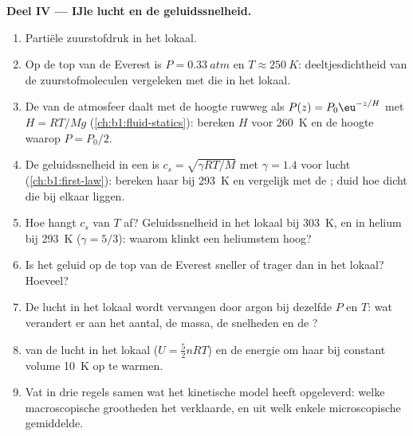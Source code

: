\begin{problem}
\medskip
\noindent\textbf{Deel IV --- IJle lucht en de geluidssnelheid.}
\begin{enumerate}[resume]
  \item Partiële zuurstofdruk in het lokaal.
  \item Op de top van de Everest is $P = \qty{0.33}{atm}$ en $T \approx \qty{250}{K}$:
        deeltjesdichtheid van de zuurstofmoleculen vergeleken met die in het lokaal.
  \item De  van de atmosfeer daalt met de hoogte ruwweg als
        $P(z) = P_0\eu^{-z/H}$ met $H = RT/Mg$ (\cref{ch:b1:fluid-statics}):
        bereken $H$ voor \qty{260}{K} en de hoogte waarop $P = P_0/2$.
  \item De geluidssnelheid in een  is $c_s = \sqrt{\gamma RT/M}$
        met $\gamma = 1.4$ voor lucht (\cref{ch:b1:first-law}): bereken haar bij
        \qty{293}{K} en vergelijk met de ; duid
        hoe dicht die bij elkaar liggen.
  \item Hoe hangt $c_s$ van $T$ af? Geluidssnelheid in het lokaal bij
        \qty{303}{K}, en in helium bij \qty{293}{K} ($\gamma = 5/3$): waarom
        klinkt een heliumstem hoog?
  \item Is het geluid op de top van de Everest sneller of trager dan in het
        lokaal? Hoeveel?
  \item De lucht in het lokaal wordt vervangen door argon bij dezelfde $P$ en $T$:
        wat verandert er aan het aantal, de massa, de snelheden en de ?
  \item {} van de lucht in het lokaal ($U = \tfrac52 nRT$) en de
        energie om haar bij constant volume \qty{10}{K} op te warmen.
  \item Vat in drie regels samen wat het kinetische model heeft opgeleverd: welke
        macroscopische grootheden het verklaarde, en uit welk enkele
        microscopische gemiddelde.
\end{enumerate}
\end{problem}
